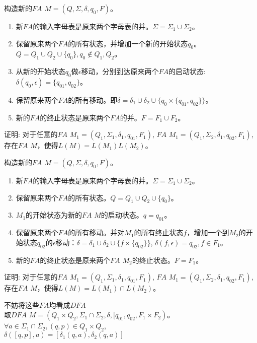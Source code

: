 \begin{solution}
	构造新的$FA$ $M=(Q,\Sigma,\delta,q_{0},F)$。
	\begin{enumerate}
		\item 新$FA$的输入字母表是原来两个字母表的并。$\Sigma = \Sigma_1\cup\Sigma_2$。
		\item 保留原来两个$FA$的所有状态，并增加一个新的开始状态$q_0$。$Q=Q_1\cup Q_2\cup \{q_0\},q_0\notin Q_1,Q_2$。
		\item 从新的开始状态$q_0$做$\epsilon$移动，分别到达原来两个$FA$的启动状态: $\delta(q_0,\epsilon) = \{q_{01},q_{02}\}$。
		\item 保留原来两个$FA$的所有移动。即$\delta = \delta_1\cup\delta_2\cup\{q_0\times\{q_{01},q_{02}\}\}$。
		\item 新的$FA$的终止状态是原来两个$FA$的并。$F=F_1\cup F_2$。
	\end{enumerate}
\end{solution}

\begin{exercise}
	证明: 对于任意的$FA$ $M_1=(Q_1,\Sigma_1,\delta_1,q_{01},F_1)$, $FA$ $M_1=(Q_1,\Sigma_2,\delta_1,q_{02},F_1)$, 存在$FA$ $M$，使得$L(M)=L(M_1)L(M_2)$。
\end{exercise}

\begin{solution}
	构造新的$FA$ $M=(Q,\Sigma,\delta,q_{0},F)$。
	\begin{enumerate}
		\item 新$FA$的输入字母表是原来两个字母表的并。$\Sigma = \Sigma_1\cup\Sigma_2$。
		\item 保留原来两个$FA$的所有状态。$Q=Q_1\cup Q_2\cup \{q_0\}$。
		\item $M_1$的开始状态为新的$FA$ $M$的启动状态。$q=q_{01}$。
		\item 保留原来两个$FA$的所有移动。并对$M_1$的所有终止状态$f$，增加一个到$M_2$的开始状态$q_{02}$的$\epsilon$移动：$\delta = \delta_1\cup\delta_2\cup\{f\times\{q_{02}\}\}$, $\delta(f,\epsilon)=q_{02},f\in F_1$。
		\item 新的$FA$的终止状态是原来两个$FA$ $M_2$的终止状态。$F=F_1$。
	\end{enumerate}
\end{solution}

\begin{exercise}
	证明: 对于任意的$FA$ $M_1=(Q_1,\Sigma_1,\delta_1,q_{01},F_1)$, $FA$ $M_1=(Q_1,\Sigma_2,\delta_1,q_{02},F_1)$, 存在$FA$ $M$，使得$L(M)=L(M_1)\cap L(M_2)$。
\end{exercise}

\begin{solution}
	不妨将这些$FA$均看成$DFA$\\
	取$DFA$ $M=(Q_1\times Q_2,\Sigma_1\cap\Sigma_2,\delta,[q_{01},q_{02},F_1\times F_2)$。\\
	$\forall a\in\Sigma_1\cap\Sigma_2,(q,p)\in Q_1\times Q_2$,\\
	$\delta([q,p],a)=[\delta_1(q,a),\delta_2(q,a)]$
\end{solution}

%


